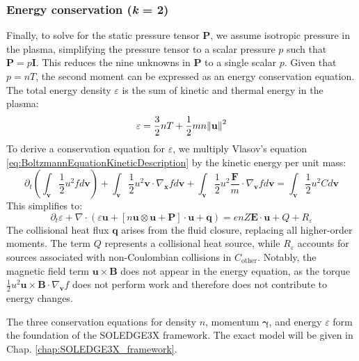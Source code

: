 \subsubsection{Energy conservation (\textit{k} = 2)}
\label{ssec:desc_energyBalance}
Finally, to solve for the static pressure tensor $\boldsymbol{P}$, we assume isotropic pressure in the plasma, simplifying the pressure tensor to a scalar pressure $p$ such that $\boldsymbol{P} = p \boldsymbol{I}$. This reduces the nine unknowns in $\boldsymbol{P}$ to a single scalar $p$. Given that $p = nT$, the second moment can be expressed as an energy conservation equation. The total energy density $\varepsilon$ is the sum of kinetic and thermal energy in the plasma:
\begin{equation}
	\varepsilon = \frac{3}{2} nT + \frac{1}{2} mn \norm{\mathbf{u}}^2
\end{equation}
To derive a conservation equation for $\varepsilon$, we multiply Vlasov's equation \ref{eq:BoltzmannEquationKineticDescription} by the kinetic energy per unit mass:
\begin{equation}
	\partial_t \left( \int_\mathbf{v} \frac{1}{2} u^2 f d\mathbf{v} \right) + \int_\mathbf{v} \frac{1}{2} u^2 \mathbf{v} \cdot \nabla_{\mathbf{x}} f d\mathbf{v} + \int_\mathbf{v} \frac{1}{2} u^2 \frac{\mathbf{F}}{m} \cdot \nabla_{\mathbf{v}} f d\mathbf{v} = \int_\mathbf{v} \frac{1}{2} u^2 C d\mathbf{v}
\end{equation}
This simplifies to:
\begin{equation}
	\label{eq:SecondMomentTransportEquation}
	\partial_t \varepsilon + \nabla \cdot \left( \varepsilon \mathbf{u} + \left[ n \mathbf{u} \otimes \mathbf{u} + \boldsymbol{P} \right] \cdot \mathbf{u} + \mathbf{q} \right) = enZ \mathbf{E} \cdot \mathbf{u} + Q + R_\varepsilon
\end{equation}
The collisional heat flux $\mathbf{q}$ arises from the fluid closure, replacing all higher-order moments. The term $Q$ represents a collisional heat source, while $R_\varepsilon$ accounts for sources associated with non-Coulombian collisions in $C_{\text{other}}$. Notably, the magnetic field term $\mathbf{u} \times \mathbf{B}$ does not appear in the energy equation, as the torque $\frac{1}{2} u^2 \mathbf{u} \times \mathbf{B} \cdot \nabla_{\mathbf{v}} f$ does not perform work and therefore does not contribute to energy changes. \newline

The three conservation equations for density $n$, momentum $\boldsymbol{\gamma}$, and energy $\varepsilon$ form the foundation of the SOLEDGE3X framework. The exact model will be given in Chap. \ref{chap:SOLEDGE3X_framework}.



